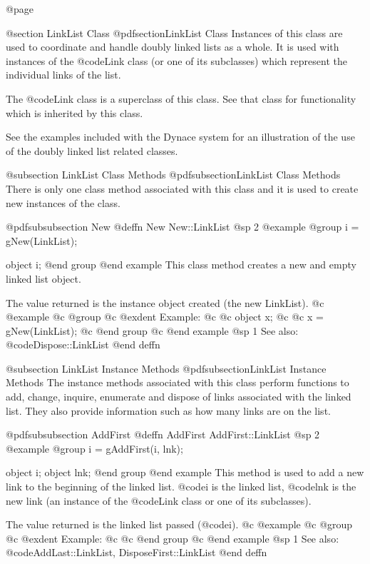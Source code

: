@page

@section LinkList Class
@pdfsection{LinkList Class}
Instances of this class are used to coordinate and handle doubly linked
lists as a whole.  It is used with instances of the @code{Link} class
(or one of its subclasses) which represent the individual links of
the list.

The @code{Link} class is a superclass of this class.  See that class
for functionality which is inherited by this class.

See the examples included with the Dynace system for an illustration of the
use of the doubly linked list related classes.


@subsection LinkList Class Methods
@pdfsubsection{LinkList Class Methods}
There is only one class method associated with this class and it is used
to create new instances of the class.







@pdfsubsubsection {New}
@deffn {New} New::LinkList
@sp 2
@example
@group
i = gNew(LinkList);

object  i;
@end group
@end example
This class method creates a new and empty linked list object.

The value returned is the instance object created (the new LinkList).
@c @example
@c @group
@c @exdent Example:
@c 
@c object  x;
@c 
@c x = gNew(LinkList);
@c @end group
@c @end example
@sp 1
See also:  @code{Dispose::LinkList}
@end deffn






@subsection LinkList Instance Methods
@pdfsubsection{LinkList Instance Methods}
The instance methods associated with this class perform functions to
add, change, inquire, enumerate and dispose of links associated with the
linked list.  They also provide information such as how many links are
on the list.








@pdfsubsubsection {AddFirst}
@deffn {AddFirst} AddFirst::LinkList
@sp 2
@example
@group
i = gAddFirst(i, lnk);

object  i;
object  lnk;
@end group
@end example
This method is used to add a new link to the beginning of the linked list.
@code{i} is the linked list, @code{lnk} is the new link (an instance of
the @code{Link} class or one of its subclasses).

The value returned is the linked list passed (@code{i}).
@c @example
@c @group
@c @exdent Example:
@c 
@c @end group
@c @end example
@sp 1
See also:  @code{AddLast::LinkList, DisposeFirst::LinkList}
@end deffn










